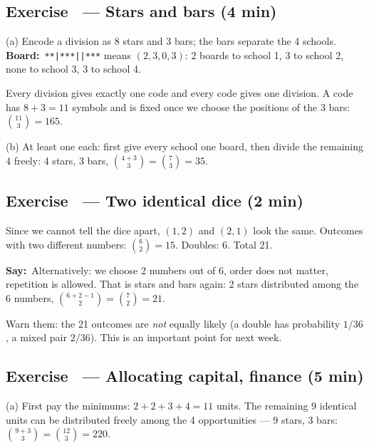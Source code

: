 \documentclass[11pt,a4paper,parskip=half]{scrartcl}
\newcommand{\say}{\textbf{\color{teal}Say:}\ }
\newcommand{\board}{\textbf{\color{gold}Board:}\ }
\newcommand{\slide}[1]{\marginpar{\raggedright\footnotesize\color{gray}slide #1}}
\begin{document}
\subsection{Exercise~ --- Stars and bars (4 min)}\slide{25}


(a) Encode a division as 8 stars and 3 bars; the bars separate the 4
schools.
\board \texttt{**|***||***} means $(2,3,0,3)$: 2 boards to school 1, 3 to
school 2, none to school 3, 3 to school 4.

Every division gives exactly one code and every code gives one division. A
code has $8+3 = 11$ symbols and is fixed once we choose the positions of the
3 bars: $\binom{11}{3} = 165$.

(b) At least one each: first give every school one board, then divide the
remaining $4$ freely: 4 stars, 3 bars, $\binom{4+3}{3}=\binom{7}{3} = 35$.

\subsection{Exercise~ --- Two identical dice (2 min)}\slide{26}


Since we cannot tell the dice apart, $(1,2)$ and $(2,1)$ look the same.
Outcomes with two different numbers: $\binom62 = 15$. Doubles: 6. Total 21.

\say Alternatively: we choose 2 numbers out of 6, order does not matter,
repetition is allowed. That is stars and bars again: 2 stars distributed
among the 6 numbers, $\binom{6+2-1}{2} = \binom72 = 21$.

\begin{cue}
	Warn them: the 21 outcomes are \emph{not} equally likely (a double has
	probability $1/36$, a mixed pair $2/36$). This is an important point for
	next week.
\end{cue}

\subsection{Exercise~ --- Allocating capital, finance (5 min)}\slide{27}


(a) First pay the minimums: $2+2+3+4 = 11$ units. The remaining $9$ identical
units can be distributed freely among the 4 opportunities --- 9 stars, 3
bars: $\binom{9+3}{3}=\binom{12}{3} = 220$.
\end{document}
